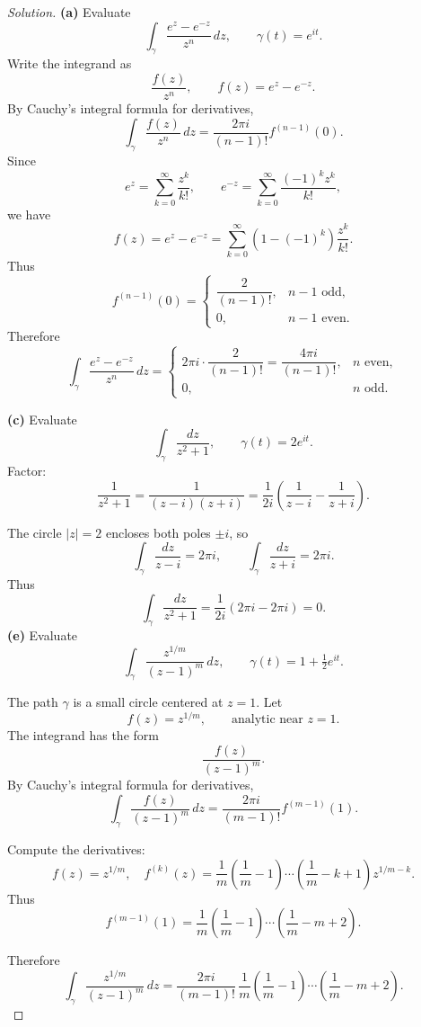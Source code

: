 \documentclass[12pt, a4paper]{report}
\theoremstyle{spaced}
\begin{document}
\begin{proof}[Solution]
	\textbf{(a)}  Evaluate
	\[
		\int_{\gamma} \frac{e^{z}-e^{-z}}{z^{n}}\,dz,
		\qquad \gamma(t)=e^{it}.
	\]
	Write the integrand as
	\[
		\frac{f(z)}{z^{n}}, \qquad f(z)= e^{z}-e^{-z}.
	\]
	By Cauchy's integral formula for derivatives,
	\[
		\int_{\gamma} \frac{f(z)}{z^{n}}\,dz
		= \frac{2\pi i}{(n-1)!} f^{(n-1)}(0).
	\]
	Since
	\[
		e^{z} = \sum_{k=0}^{\infty} \frac{z^{k}}{k!}, \qquad
		e^{-z} = \sum_{k=0}^{\infty} \frac{(-1)^{k} z^{k}}{k!},
	\]
	we have
	\[
		f(z) = e^{z}-e^{-z}
		= \sum_{k=0}^{\infty} \left(1-(-1)^{k}\right)\frac{z^{k}}{k!}.
	\]
	Thus
	\[
		f^{(n-1)}(0) =
		\begin{cases}
			\dfrac{2}{(n-1)!}, & n-1 \text{ odd},  \\[6pt]
			0,                 & n-1 \text{ even}.
		\end{cases}
	\]
	Therefore
	\[
		\displaystyle
		\int_{\gamma} \frac{e^{z}-e^{-z}}{z^{n}}\,dz
		=
		\begin{cases}
			\displaystyle 2\pi i \cdot \dfrac{2}{(n-1)!} = \dfrac{4\pi i}{(n-1)!}, & n \text{ even}, \\[10pt]
			0,                                                                     & n \text{ odd}.
		\end{cases}
	\]

	\bigskip
	\textbf{(c)} Evaluate
	\[
		\int_{\gamma} \frac{dz}{z^{2}+1},
		\qquad \gamma(t)=2e^{it}.
	\]
	Factor:
	\[
		\frac{1}{z^{2}+1}
		= \frac{1}{(z-i)(z+i)}
		= \frac{1}{2i}\left( \frac{1}{z-i} - \frac{1}{z+i} \right).
	\]

	The circle $|z|=2$ encloses both poles $\pm i$, so
	\[
		\int_{\gamma} \frac{dz}{z-i} = 2\pi i,
		\qquad
		\int_{\gamma} \frac{dz}{z+i} = 2\pi i.
	\]
	Thus
	\[
		\int_{\gamma} \frac{dz}{z^{2}+1}
		= \frac{1}{2i}\left(2\pi i - 2\pi i\right) = 0.
	\]
	\bigskip
	\textbf{(e)} Evaluate
	\[
		\int_{\gamma} \frac{z^{1/m}}{(z-1)^{m}}\,dz,
		\qquad \gamma(t)=1+\tfrac12 e^{it}.
	\]

	The path $\gamma$ is a small circle centered at $z=1$.  Let
	\[
		f(z)= z^{1/m},
		\qquad \text{analytic near } z=1.
	\]
	The integrand has the form
	\[
		\frac{f(z)}{(z-1)^{m}}.
	\]
	By Cauchy’s integral formula for derivatives,
	\[
		\int_{\gamma} \frac{f(z)}{(z-1)^{m}}\,dz
		= \frac{2\pi i}{(m-1)!} f^{(m-1)}(1).
	\]

	Compute the derivatives:
	\[
		f(z)= z^{1/m},\quad
		f^{(k)}(z)
		= \frac{1}{m}\left(\frac{1}{m}-1\right)\cdots\left(\frac{1}{m}-k+1\right) z^{1/m-k}.
	\]
	Thus
	\[
		f^{(m-1)}(1)
		= \frac{1}{m}\left(\frac{1}{m}-1\right)\cdots\left(\frac{1}{m}-m+2\right).
	\]

	Therefore
	\[
		\displaystyle
		\int_{\gamma} \frac{z^{1/m}}{(z-1)^{m}}\,dz
		=
		\frac{2\pi i}{(m-1)!}
		\,\frac{1}{m}\left(\frac{1}{m}-1\right)\cdots\left(\frac{1}{m}-m+2\right).
	\]

\end{proof}
\end{document}
